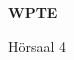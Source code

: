 \documentclass[a4paper]{article}
\begin{document}
\printGenericVSLHeader
\begin{center}
\begin{vsltext}{3cm}{4cm}

   \vspace{0.5cm} 

    \textbf{WPTE} 

    \vspace{1.5cm}

    Hörsaal 4

\end{vsltext}

\end{center}
\end{document}
